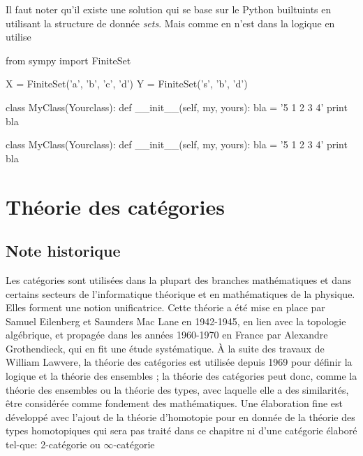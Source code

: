 \begin{solution}
Il faut noter qu'il existe une solution qui se base sur le Python builtuints en utilisant la structure de donnée \textit{sets}. Mais comme en n'est dans la logique en utilise 
\begin{python}
from sympy import FiniteSet

X = FiniteSet('a', 'b', 'c', 'd')
Y = FiniteSet('s', 'b', 'd')

class MyClass(Yourclass):
    def __init__(self, my, yours):
        bla = '5 1 2 3 4'
        print bla
\end{python}
\begin{python}
class MyClass(Yourclass):
    def __init__(self, my, yours):
        bla = '5 1 2 3 4'
        print bla
\end{python}

\end{solution}
\chapter{Théorie des catégories}
\section{Note historique}
Les catégories sont utilisées dans la plupart des branches mathématiques et dans certains secteurs de l'informatique théorique et en mathématiques de la physique. Elles forment une notion unificatrice. Cette théorie a été mise en place par Samuel Eilenberg et Saunders Mac Lane en 1942-1945, en lien avec la topologie algébrique, et propagée dans les années 1960-1970 en France par Alexandre Grothendieck, qui en fit une étude systématique. À la suite des travaux de William Lawvere, la théorie des catégories est utilisée depuis 1969 pour définir la logique et la théorie des ensembles ; la théorie des catégories peut donc, comme la théorie des ensembles ou la théorie des types, avec laquelle elle a des similarités, être considérée comme fondement des mathématiques. Une élaboration fine est développé avec l'ajout de la théorie d'homotopie pour en donnée de la théorie des types homotopiques qui sera pas traité dans ce chapitre  ni d'une catégorie élaboré tel-que: 2-catégorie ou $\infty$-catégorie
